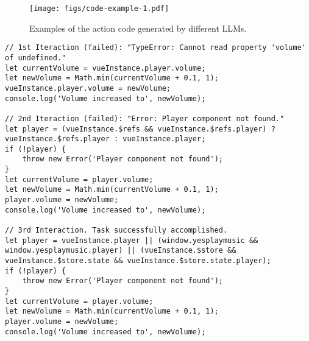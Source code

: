 \begin{figure}
    \centering
     \texttt{[image: figs/code-example-1.pdf]}
    \caption{Examples of the action code generated by different LLMs.}
    \label{fig:code-example}
\end{figure}

\begin{lstlisting}[label=code:multi-iterations,caption=An example of how multi-round interactions between execution sandbox and code agent helps task accomplishment. Task: ``increase the volume slightly'' on music player; model: o3-mini.]
// 1st Iteraction (failed): "TypeError: Cannot read property 'volume' of undefined."
let currentVolume = vueInstance.player.volume;
let newVolume = Math.min(currentVolume + 0.1, 1);
vueInstance.player.volume = newVolume;
console.log('Volume increased to', newVolume);

// 2nd Iteraction (failed): "Error: Player component not found."
let player = (vueInstance.$refs && vueInstance.$refs.player) ? vueInstance.$refs.player : vueInstance.player;
if (!player) {
    throw new Error('Player component not found');
}
let currentVolume = player.volume;
let newVolume = Math.min(currentVolume + 0.1, 1);
player.volume = newVolume;
console.log('Volume increased to', newVolume);

// 3rd Interaction. Task successfully accomplished.
let player = vueInstance.player || (window.yesplaymusic && window.yesplaymusic.player) || (vueInstance.$store && vueInstance.$store.state && vueInstance.$store.state.player);
if (!player) {
    throw new Error('Player component not found');
}
let currentVolume = player.volume;
let newVolume = Math.min(currentVolume + 0.1, 1);
player.volume = newVolume;
console.log('Volume increased to', newVolume);
\end{lstlisting}
